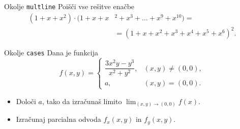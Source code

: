 \begin{frame}{Okolje \texttt{multline}}
	Poišči vse rešitve enačbe
	\begin{align*}
		(1+x+x^2) \cdot (1+x+x&^2+x^3+\ldots+x^9+x^{10}) = \\
		&=(1+x+x^2+x^3+x^4+x^5+x^6)^2.
	\end{align*}
	
\end{frame}

\begin{frame}{Okolje \texttt{cases}}
	Dana je funkcija
	\begin{equation*}
		f(x,y)=
\begin{cases}
	\dfrac{3x^{2}y - y^{3}}{x^{2}+y^{2}}, & (x,y)\neq(0,0), \\
	a, & (x,y)=(0,0).
\end{cases}
	\end{equation*}
		
		
	\begin{itemize}

	\item Določi $a$, tako da izračunaš limito $\lim_{(x,y)\to(0,0)} f(x).$
	\item Izračunaj parcialna odvoda $f_x(x,y)$ in $f_y(x,y)$.
	\end{itemize}
\end{frame}
